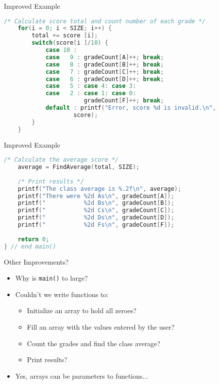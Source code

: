 \documentclass[graphics]{beamer}
\begin{document}
\begin{frame}[fragile]{Improved Example}
    \begin{lstlisting}[language=C,basicstyle=\footnotesize,keywordstyle=\color{blue},commentstyle=\color{green},showstringspaces=false,stringstyle=\color{red}]
    /* Calculate score total and count number of each grade */
    for(i = 0; i < SIZE; i++) {
        total += score [i];
        switch(score[i ]/10) {
            case 10 :
            case   9 : gradeCount[A]++; break;
            case   8 : gradeCount[B]++; break;
            case   7 : gradeCount[C]++; break;
            case   6 : gradeCount[D]++; break;
            case   5 : case 4: case 3:
            case   2 : case 1: case 0:
                       gradeCount[F]++; break;
            default : printf("Error, score %d is invalid.\n",
                    score);
        }
    }
    \end{lstlisting}
\end{frame}

\begin{frame}[fragile]{Improved Example}
    \begin{lstlisting}[language=C,basicstyle=\footnotesize,keywordstyle=\color{blue},commentstyle=\color{green},showstringspaces=false,stringstyle=\color{red}]
    /* Calculate the average score */
    average = FindAverage(total, SIZE);
    
    /* Print results */
    printf("The class average is %.2f\n", average);
    printf("There were %2d As\n", gradeCount[A]);
    printf("           %2d Bs\n", gradeCount[B]);
    printf("           %2d Cs\n", gradeCount[C]);
    printf("           %2d Ds\n", gradeCount[D]);
    printf("           %2d Fs\n", gradeCount[F]);
    
    return 0;
} // end main()
    \end{lstlisting}
\end{frame}

\begin{frame}{Other Improvements?}
    \begin{itemize}
        \item Why is \texttt{main()} to large?
        \item Couldn't we write functions to:
        \begin{itemize}
            \item Initialize an array to hold all zeroes?
            \item Fill an array with the values entered by the user?
            \item Count the grades and find the class average?
            \item Print results?
        \end{itemize}
        \item Yes, arrays can be parameters to functions...
    \end{itemize}
\end{frame}
\end{document}
